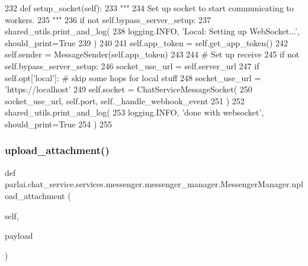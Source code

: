 \begin{DoxyCode}
232     \textcolor{keyword}{def }setup\_socket(self):
233         \textcolor{stringliteral}{"""}
234 \textcolor{stringliteral}{        Set up socket to start communicating to workers.}
235 \textcolor{stringliteral}{        """}
236         \textcolor{keywordflow}{if} \textcolor{keywordflow}{not} self.bypass\_server\_setup:
237             shared\_utils.print\_and\_log(
238                 logging.INFO, \textcolor{stringliteral}{'Local: Setting up WebSocket...'}, should\_print=\textcolor{keyword}{True}
239             )
240 
241         self.app\_token = self.get\_app\_token()
242         self.sender = MessageSender(self.app\_token)
243 
244         \textcolor{comment}{# Set up receive}
245         \textcolor{keywordflow}{if} \textcolor{keywordflow}{not} self.bypass\_server\_setup:
246             socket\_use\_url = self.server\_url
247             \textcolor{keywordflow}{if} self.opt[\textcolor{stringliteral}{'local'}]:  \textcolor{comment}{# skip some hops for local stuff}
248                 socket\_use\_url = \textcolor{stringliteral}{'https://localhost'}
249             self.socket = ChatServiceMessageSocket(
250                 socket\_use\_url, self.port, self.\_handle\_webhook\_event
251             )
252         shared\_utils.print\_and\_log(
253             logging.INFO, \textcolor{stringliteral}{'done with websocket'}, should\_print=\textcolor{keyword}{True}
254         )
255 
\end{DoxyCode}
\mbox{\label{classparlai_1_1chat__service_1_1services_1_1messenger_1_1messenger__manager_1_1MessengerManager_a64b1a7241aecdca1d321efa92134ff96}} 
\subsubsection{\texorpdfstring{upload\+\_\+attachment()}{upload\_attachment()}}
{\footnotesize\ttfamily def parlai.\+chat\+\_\+service.\+services.\+messenger.\+messenger\+\_\+manager.\+Messenger\+Manager.\+upload\+\_\+attachment (\begin{DoxyParamCaption}\item[{}]{self,  }\item[{}]{payload }\end{DoxyParamCaption})}

